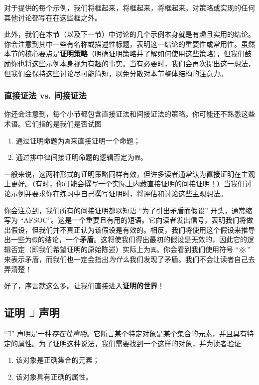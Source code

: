 对于提供的每个示例，我们将\setlength\fboxsep{1pt}框起来，将框起来，将框起来。对策略或实现的任何其他讨论都写在在这些框之外。

此外，我们在本节（以及下一节）中讨论的几个示例本身就是有趣且实用的结论。你会注意到其中一些有名称或描述性标题，表明这一结论的重要性或常用性。虽然本节的核心要点是\textbf{证明策略}（明确证明策略并了解如何使用这些策略），但我们鼓励你也将这些示例本身视为有趣的事实。当有必要时，我们会再次提出这一想法，但我们会保持这些讨论尽可能简短，以免分散对本节整体结构的注意力。

\subsubsection*{直接证法 vs. 间接证法}

你还会注意到，每个小节都包含直接证法和间接证法的策略。你可能还不熟悉这些术语。它们指的是我们是否试图
\begin{enumerate}[label=(\arabic*)]
    \item 通过证明命题为\verb|真|来直接证明一个命题；
    \item 通过排中律间接证明命题的逻辑否定为\verb|假|。
\end{enumerate}

一般来说，这两种形式的证明策略同样有效，但许多读者通常认为\textbf{直接}证明在主观上更好。（有时，你可能会撰写一个实际上内藏直接证明的间接证明！）当我们讨论示例并要求你在练习中自己撰写证明时，将评估和讨论这些主观想法。

你会注意到，我们所有的间接证明都以短语 ``为了引出矛盾而假设'' 开头，通常缩写为 ``AFSOC''。这是一个重要且有用的短语。它向读者发出信号，表明我们将做出假设，但我们并不真正认为该假设是有效的。相反，我们将使用这个假设来推导出一些为\verb|假|的结论，一个\textbf{矛盾}。这将使我们得出最初的假设是无效的，因此它的逻辑否定（即我们希望证明的原始陈述）实际上为\verb|真|。你会看到我们使用符号 ``$\hashx$'' 来表示矛盾，而我们也一定会指出\emph{为什么}我们发现了矛盾。我们不会让读者自己去弄清楚！

好了，序言就这么多。让我们直接进入\textbf{证明的世界}！

\subsection{证明 $\exists$ 声明}\label{sec:section4.9.1}

``$\exists$'' 声明是一种\emph{存在性声明}。它断言某个特定对象是某个集合的元素，并且具有特定的属性。为了证明这种说法，我们需要找到一个这样的对象，并为读者验证
\begin{enumerate}[label=(\arabic*)]
    \item 该对象是正确集合的元素；
    \item 该对象具有正确的属性。
\end{enumerate}

